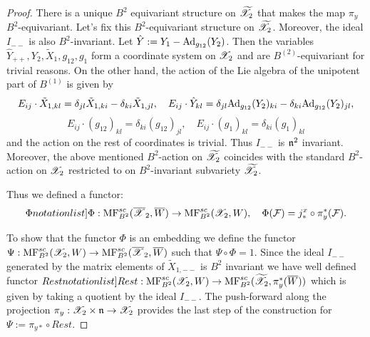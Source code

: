 \begin{proof}
There is a unique $B^2$ equivariant structure on $\widetilde{\mathscr{X}}_2$ that makes  the map $\pi_y$  $B^2$-equivariant. Let's fix this $B^2$-equivariant structure on $\widetilde{\mathscr{X}}_2$.
Moreover, the ideal $I_{--}$ is also $B^2$-invariant. Let $\hat{Y}:=Y_{1}-{\rm Ad}_{g_{12}}(Y_2)$.
Then the variables $\hat{Y}_{++},  Y_2, \tilde{X}_1, g_{12}, g_1$ form a coordinate system on $\mathscr{X}_2$ and are $B^{(2)}$-equivariant for trivial reasons.
On the other hand, the action of the Lie algebra of the unipotent part of $B^{(1)}$ is given
by
\[ E_{ij}\cdot \tilde{X}_{1,kl}=\delta_{jl} \tilde{X}_{1,ki}-\delta_{ki} \tilde{X}_{1,jl},\quad  E_{ij}\cdot \hat{Y}_{kl}=\delta_{jl} {\rm Ad}_{g_{12}}(Y_2)_{ki}-\delta_{ki} {\rm Ad}_{g_{12}}(Y_2)_{jl},\]
\[E_{ij}\cdot (g_{12})_{kl}=
\delta_{ki}(g_{12})_{jl},\quad E_{ij}\cdot (g_1)_{kl}=\delta_{ki}(g_1)_{kl}
\]
 and the action on the rest of coordinates is trivial. Thus $I_{--}$ is $\mathfrak{n}^2$ invariant.
  Moreover, the above mentioned $B^2$-action on $\widetilde{\mathscr{X}}_2$ coincides with the standard $B^2$-action on $\mathscr{X}_2$ restricted to
 on $B^2$-invariant subvariety $\widetilde{\mathscr{X}}_2$.

 Thus we defined a functor:
 $$\SymbolPrint{\Phi}:\MF_{B^2}(\calXr_2,\Wr)\to \MF_{B^2}(\calX_2,W),\quad \Phi(\calF)=j^x_*\circ \pi_y^*(\calF).$$






To show that the functor $\Phi$ is an embedding we define the functor $\Psi : \mathrm{MF}^{sc}_{B^2}(\mathscr{X}_2,W)\to \mathrm{MF}^{sc}_{B^2}(\overline{\mathscr{X}}_2,\overline{W})$ such that $\Psi\circ\Phi= 1$.
Since the ideal $I_{--}$ generated by the matrix elements of $\tilde{X}_{1,--}$ is $B^2$ invariant we have well defined functor
$\SymbolPrint{Rest}: \MF_{B^2}(\calX_2,W)\to \MF_{B^2}(\widetilde{\calX_2}, \pi_y^*(\Wr))$ which is given by taking a quotient by the ideal $I_{--}$.
The push-forward along the projection $\pi_y: \mathscr{X}_2\times \mathfrak{n}\to \mathscr{X}_2$ provides the last step of the construction for
$\Psi:=\pi_{y*}\circ Rest$.
\end{proof}

